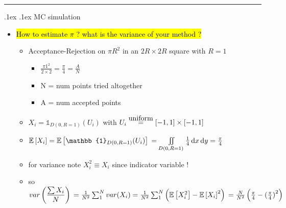 \documentclass[10pt,landscape,a4paper]{article}
\makeatletter
\renewcommand{\section}{\@startsection{section}{1}{0mm}%
                                {.1ex}%
                                {.1ex}%
                                {\color{blue}\sffamily\small\bfseries}}
\newcommand{\myE}[1]{ \mathbb{E} \left[ #1 \right] }
\newcommand\myeq[1]{\stackrel{{\normalfont\mbox{#1}}}{ = }}
\newcommand{\mylp}{ \left ( }
\newcommand{\myrp}{ \right ) }
\newcommand*\dif{\mathop{}\!\mathrm{d}}
\makeatother
\begin{document}
\begin{multicols*}{4}
\begin{spacing}{0.1}
\begin{itemize}
\end{itemize}

\hrule
\section {MC simulation}

\begin{itemize}
	
\item \hl{How to estimate $\pi$ ? what is the variance of your method ?}
\begin{itemize}
	\item Acceptance-Rejection on $\pi R^2$ in an $2R \times 2R$ square with $R=1$
	\begin{itemize}
	\item $\frac{\pi 1^2}{2 \times 2}=\frac{\pi}{4}= \frac{A}{N}$
	\item N = num points tried altogether
	\item A = num accepted points
	\end{itemize}
	\item $X_i = \mathbb{1}_{D(0,R=1)} (U_i)$ with $U_i \myeq{uniform} [-1,1] \times [-1,1]$ 
	\item $\myE{X_i} = \myE{\mathbb{1}_{D(0,R=1)} (U_i)} \\ =\iint\limits_{D(0,R=1)} \frac{1}{4}  \dif x \dif y = \frac{\pi}{4} $ 
	\item  for variance note $X^2_i \equiv X_i$ since indicator variable !
	\item so $var \mylp \dfrac{\sum X_i}{N}\myrp  \\= \frac{1}{N^2} \sum_1^N var(X_i) \\= \frac{1}{N^2} \sum_1^N \mylp \myE{X_i^2} - {\myE{X_i}}^2 \myrp \\= \frac{N}{N^2} \mylp \frac{\pi}{4} - {(\frac{\pi}{4})}^2 \myrp $ 
\end{itemize}

\end{itemize}


\end{spacing}
\end{multicols*}
\end{document}
